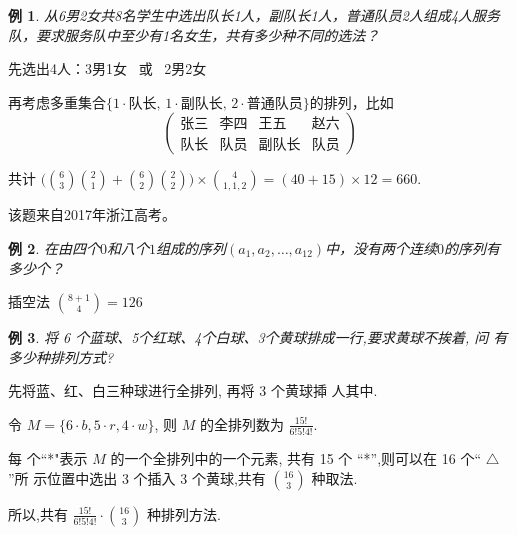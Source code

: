 \documentclass[13pt, punct]{ctexbeamer}
\newtheorem{ex}{例}[section]
\begin{document}
\begin{frame}
\begin{ex}
	从6男2女共8名学生中选出队长1人，副队长1人，普通队员2人组成4人服务队，要求服务队中至少有1名女生，共有多少种不同的选法？
\end{ex}
\pause
先选出4人：\quad 3男1女 \, 或 \, 2男2女

再考虑多重集合$\{1\cdot \mbox{队长}, \, 1 \cdot \mbox{副队长},\,  2 \cdot \mbox{普通队员} \}$的排列，比如
$$\left(\begin{array}{cccc}
\text{张三} & \text{李四} & \text{王五} & \text{赵六}\\
\text{队长} & \text{队员} & \text{副队长} & \text{队员}
\end{array}\right)$$


共计 $\big( {6 \choose 3} {2 \choose 1}  + {6 \choose 2} {2 \choose 2}  \big) \times {4 \choose 1,1,2}
= (40+15)\times 12 =660$.


该题来自2017年浙江高考。
\end{frame}


\begin{frame}


\begin{ex}	在由四个$0$和八个$1$组成的序列$(a_1,a_2,\ldots,a_{12})$中，没有两个连续$0$的序列有多少个？
\end{ex}

\pause
{插空法} \quad $\displaystyle {8+1 \choose 4}=126$




\end{frame}

\begin{frame}
\begin{ex}
将 6 个蓝球、5个红球、4个白球、3个黄球排成一行,要求黄球不挨着, 问 有多少种排列方式?
\end{ex}
\pause
 先将蓝、红、白三种球进行全排列, 再将 3 个黄球揷 人其中.

 令 $M=\{6 \cdot b, 5 \cdot r, 4 \cdot w\}$, 则 $M$ 的全排列数为 $\frac{15 !}{6 ! 5 ! 4 !}$.

  每 个“*"表示 $M$ 的一个全排列中的一个元素, 共有 15 个 “*”,则可以在 16 个“ $\triangle$ ”所 示位置中选出 3 个插入 3 个黄球,共有 $ \binom{16}{3}$ 种取法.

  所以,共有 $\frac{15 !}{6 ! 5 ! 4 !} \cdot \binom{16}{3}$ 种排列方法.

\end{frame}
\end{document}
